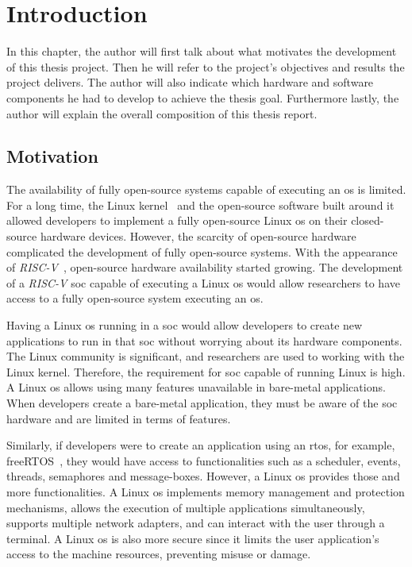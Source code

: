 \chapter{Introduction}
\label{chapter:introduction}
In this chapter, the author will first talk about what motivates the development of this thesis project. Then he will refer to the project's objectives and results the project delivers. The author will also indicate which hardware and software components he had to develop to achieve the thesis goal. Furthermore lastly, the author will explain the overall composition of this thesis report.

\section{Motivation}
\label{section:motivation}
The availability of fully open-source systems capable of executing an \acrfull{os} is limited. For a long time, the Linux kernel~\cite{torvalds1997linux} and the open-source software built around it allowed developers to implement a fully open-source Linux \acrshort{os} on their closed-source hardware devices. However, the scarcity of open-source hardware complicated the development of fully open-source systems. With the appearance of \textit{RISC-V}~\cite{asanovic2014instruction}, open-source hardware availability started growing. The development of a \textit{RISC-V} \acrfull{soc} capable of executing a Linux \acrshort{os} would allow researchers to have access to a fully open-source system executing an \acrshort{os}.

Having a Linux \acrshort{os} running in a \acrshort{soc} would allow developers to create new applications to run in that \acrshort{soc} without worrying about its hardware components. The Linux community is significant, and researchers are used to working with the Linux kernel. Therefore, the requirement for \acrshort{soc} capable of running Linux is high. A Linux \acrshort{os} allows using many features unavailable in bare-metal applications. When developers create a bare-metal application, they must be aware of the \acrshort{soc} hardware and are limited in terms of features.

Similarly, if developers were to create an application using an \acrfull{rtos}, for example, freeRTOS~\cite{barry2008freertos}, they would have access to functionalities such as a scheduler, events, threads, semaphores and message-boxes. However, a Linux \acrshort{os} provides those and more functionalities. A Linux \acrshort{os} implements memory management and protection mechanisms, allows the execution of multiple applications simultaneously, supports multiple network adapters, and can interact with the user through a terminal. A Linux \acrshort{os} is also more secure since it limits the user application's access to the machine resources, preventing misuse or damage.

